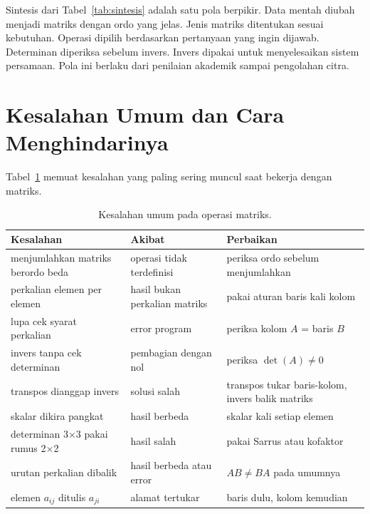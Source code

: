 \documentclass[11pt,a4paper]{article}
\begin{document}
Sintesis dari Tabel~\ref{tab:sintesis} adalah satu pola berpikir. Data mentah diubah menjadi matriks dengan ordo yang jelas. Jenis matriks ditentukan sesuai kebutuhan. Operasi dipilih berdasarkan pertanyaan yang ingin dijawab. Determinan diperiksa sebelum invers. Invers dipakai untuk menyelesaikan sistem persamaan. Pola ini berlaku dari penilaian akademik sampai pengolahan citra.

\section{Kesalahan Umum dan Cara Menghindarinya}

Tabel~\ref{tab:kesalahan} memuat kesalahan yang paling sering muncul saat bekerja dengan matriks.

\begin{table}[H]
	\centering
	\caption{Kesalahan umum pada operasi matriks.}
	\label{tab:kesalahan}
	\footnotesize
	\begin{tabularx}{\textwidth}{l X X}
		\toprule
		Kesalahan                                    & Akibat                        & Perbaikan                                        \\
		\midrule
		menjumlahkan matriks berordo beda            & operasi tidak terdefinisi     & periksa ordo sebelum menjumlahkan                \\
		perkalian elemen per elemen                  & hasil bukan perkalian matriks & pakai aturan baris kali kolom                    \\
		lupa cek syarat perkalian                    & error program                 & periksa kolom $A$ = baris $B$                    \\
		invers tanpa cek determinan                  & pembagian dengan nol          & periksa $\det(A) \ne 0$                          \\
		transpos dianggap invers                     & solusi salah                  & transpos tukar baris-kolom, invers balik matriks \\
		skalar dikira pangkat                        & hasil berbeda                 & skalar kali setiap elemen                        \\
		determinan 3$\times$3 pakai rumus 2$\times$2 & hasil salah                   & pakai Sarrus atau kofaktor                       \\
		urutan perkalian dibalik                     & hasil berbeda atau error      & $AB \ne BA$ pada umumnya                         \\
		elemen $a_{ij}$ ditulis $a_{ji}$             & alamat tertukar               & baris dulu, kolom kemudian                       \\
		\bottomrule
	\end{tabularx}
\end{table}
\end{document}
